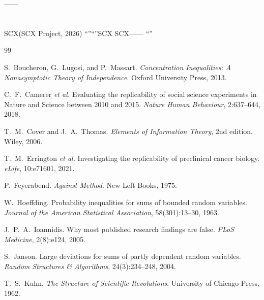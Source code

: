 \documentclass[11pt,a4paper]{article}
\theoremstyle{remark}
\begin{document}
——

\textbf{}\textbf{}



\section*{}

SCX(SCX Project, 2026)
``''``''SCX
SCX——
``''

\begin{thebibliography}{99}

S.~Boucheron, G.~Lugosi, and P.~Massart.
\newblock \emph{Concentration Inequalities: A Nonasymptotic Theory of Independence}.
\newblock Oxford University Press, 2013.

C.~F.~Camerer \emph{et al.}
\newblock Evaluating the replicability of social science experiments in Nature and Science between 2010 and 2015.
\newblock \emph{Nature Human Behaviour}, 2:637--644, 2018.

T.~M.~Cover and J.~A.~Thomas.
\newblock \emph{Elements of Information Theory}, 2nd edition.
\newblock Wiley, 2006.

T.~M.~Errington \emph{et al.}
\newblock Investigating the replicability of preclinical cancer biology.
\newblock \emph{eLife}, 10:e71601, 2021.

P.~Feyerabend.
\newblock \emph{Against Method}.
\newblock New Left Books, 1975.

W.~Hoeffding.
\newblock Probability inequalities for sums of bounded random variables.
\newblock \emph{Journal of the American Statistical Association}, 58(301):13--30, 1963.

J.~P.~A.~Ioannidis.
\newblock Why most published research findings are false.
\newblock \emph{PLoS Medicine}, 2(8):e124, 2005.

S.~Janson.
\newblock Large deviations for sums of partly dependent random variables.
\newblock \emph{Random Structures \& Algorithms}, 24(3):234--248, 2004.

T.~S.~Kuhn.
\newblock \emph{The Structure of Scientific Revolutions}.
\newblock University of Chicago Press, 1962.


\end{thebibliography}
\end{document}
